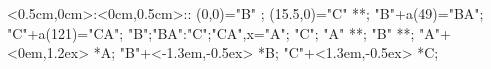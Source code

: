%

\xy    <0.5cm,0cm>:<0cm,0.5cm>::
       (0,0)="B" ; (15.5,0)="C" **\dir{-}; 
       "B"+a(49)="BA"; "C"+a(121)="CA";
       {"B";"BA":"C";"CA",x}="A"; 
       "C"; "A" **\dir{-}; "B" **\dir{-};
	 "A"+<0em,1.2ex> *{A};
	 "B"+<-1.3em,-0.5ex> *{B};
	 "C"+<1.3em,-0.5ex> *{C};
       \endxy%
